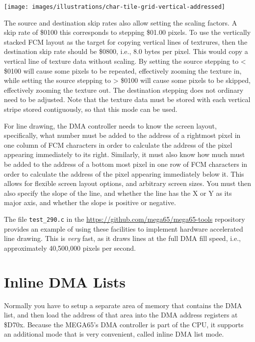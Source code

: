\begin{center}
\texttt{[image: images/illustrations/char-tile-grid-vertical-addressed]}
\end{center}


The source and destination
skip rates also allow setting the scaling factors.  A skip rate of \$0100 this corresponds to stepping \$01.00 pixels.
To use the vertically stacked FCM layout as the target for copying vertical lines of textrures, then the destination
skip rate should be \$0800, i.e., 8.0 bytes per pixel.  This would copy a vertical line of texture data without scaling.
By setting the source stepping to < \$0100 will cause some pixels to be repeated, effectively zooming the texture in,
while setting the source stepping to > \$0100 will cause some pixels to be skipped, effectively zooming the texture out.
The destination stepping does not ordinary need to be adjusted.  Note that the texture data must be stored with each
vertical stripe stored contiguously, so that this mode can be used.

For line drawing, the DMA controller needs to know the screen layout, specifically, what number must be added to the
address of a rightmost pixel in one column of FCM characters in order to calculate the address of the pixel appearing
immediately to its right. Similarly, it must also know how much must be added to the address of a bottom most pixel in
one row of FCM characters in order to calculate the address of the pixel appearing immediately below it.  This allows
for flexible screen layout options, and arbitrary screen sizes.  You must then also specify the slope of the line, and
whether the line has the X or Y as its major axis, and whether the slope is positive or negative.

The file {\tt test\_290.c}
in the \url{https://github.com/mega65/mega65-tools} repository provides an example of using these facilities to
implement hardware accelerated line drawing. This is {\em very} fast, as it draws lines at the full DMA fill speed,
i.e., approximately 40,500,000 pixels per second.

\section{Inline DMA Lists}

Normally you have to setup a separate area of memory that contains the DMA list, and then load the address of that
area into the DMA address registers at \$D70x.  Because the MEGA65's DMA controller is part of the CPU, it supports
an additional mode that is very convenient, called inline DMA list mode.  

